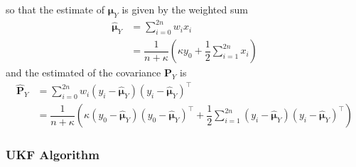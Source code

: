 \documentclass[11pt]{report} %
\begin{document}
so that the estimate of $\boldsymbol{\mu}_{Y}$ is given by the weighted sum
\begin{align}
\hat{\boldsymbol{\mu}}_{Y} &= \sum_{i = 0}^{2n}w_{i}x_{i} \\
&= \dfrac{1}{n + \kappa}\left(\kappa y_{0} + \dfrac{1}{2}\sum_{i = 1}^{2n}x_{i}\right)
\end{align}
and the estimated of the covariance $\mathbf{P}_{Y}$ is
\begin{align}
\widehat{\mathbf{P}}_{Y} &= \sum_{i = 0}^{2n}w_{i}\left(y_{i} - \hat{\boldsymbol{\mu}}_{Y}\right)\left(y_{i} - \hat{\boldsymbol{\mu}}_{Y}\right)^{\top} \\
&= \dfrac{1}{n + \kappa}\left(\kappa \left(y_{0} - \hat{\boldsymbol{\mu}}_{Y}\right)\left(y_{0} - \hat{\boldsymbol{\mu}}_{Y}\right)^{\top} + \dfrac{1}{2}\sum_{i = 1}^{2n}\left(y_{i} - \hat{\boldsymbol{\mu}}_{Y}\right)\left(y_{i} - \hat{\boldsymbol{\mu}}_{Y}\right)^{\top}\right)
\end{align}

\subsubsection{UKF Algorithm}
\end{document}
